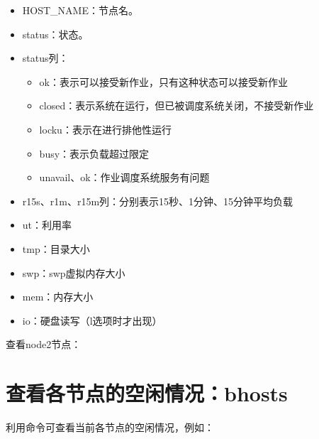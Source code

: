 \documentclass[a4paper,12pt,english]{sphinxmanual}
\begin{document}
\begin{itemize}
\item {} 
\sphinxAtStartPar
HOST\_NAME：节点名。

\item {} 
\sphinxAtStartPar
status：状态。

\item {} 
\sphinxAtStartPar
status列：
\begin{itemize}
\item {} 
\sphinxAtStartPar
ok：表示可以接受新作业，只有这种状态可以接受新作业

\item {} 
\sphinxAtStartPar
closed：表示系统在运行，但已被调度系统关闭，不接受新作业

\item {} 
\sphinxAtStartPar
locku：表示在进行排他性运行

\item {} 
\sphinxAtStartPar
busy：表示负载超过限定

\item {} 
\sphinxAtStartPar
unavail、\sphinxhyphen{}ok：作业调度系统服务有问题

\end{itemize}

\item {} 
\sphinxAtStartPar
r15s、r1m、r15m列：分别表示15秒、1分钟、15分钟平均负载

\item {} 
\sphinxAtStartPar
ut：利用率

\item {} 
\sphinxAtStartPar
tmp：目录大小

\item {} 
\sphinxAtStartPar
swp：swp虚拟内存大小

\item {} 
\sphinxAtStartPar
mem：内存大小

\item {} 
\sphinxAtStartPar
io：硬盘读写（\sphinxhyphen{}l选项时才出现）

\end{itemize}

\sphinxAtStartPar
查看node2节点：


\section{查看各节点的空闲情况：bhosts}
\label{\detokenize{lsf/lsf:bhosts}}
\sphinxAtStartPar
利用命令可查看当前各节点的空闲情况，例如：
\end{document}
